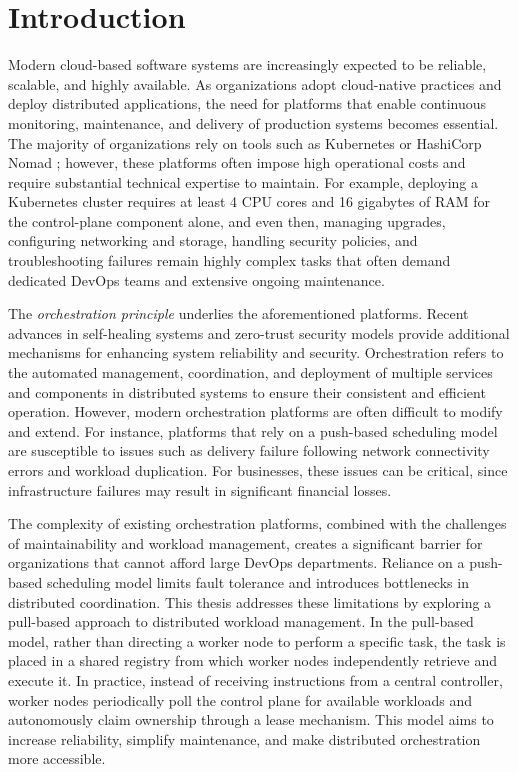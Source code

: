 \chapter{Introduction}
\label{chap:intro}

Modern cloud-based software systems are increasingly expected to be reliable, scalable, and highly available. As organizations adopt cloud-native practices and deploy distributed applications, the need for platforms that enable continuous monitoring, maintenance, and delivery of production systems becomes essential. The majority of organizations rely on tools such as Kubernetes \cite{k8s_docs} or HashiCorp Nomad \cite{nomad_docs}; however, these platforms often impose high operational costs and require substantial technical expertise to maintain. For example, deploying a Kubernetes cluster requires at least 4 CPU cores and 16 gigabytes of RAM for the control-plane component alone, and even then, managing upgrades, configuring networking and storage, handling security policies, and troubleshooting failures remain highly complex tasks that often demand dedicated DevOps teams and extensive ongoing maintenance.

The \textit{orchestration principle} \cite{sebrechts2018orchestrator, tosca2015simple} underlies the aforementioned platforms. Recent advances in self-healing systems \cite{rauba2024neurips} and zero-trust security models \cite{vankayalapati2025zerotrust} provide additional mechanisms for enhancing system reliability and security. Orchestration refers to the automated management, coordination, and deployment of multiple services and components in distributed systems to ensure their consistent and efficient operation. However, modern orchestration platforms are often difficult to modify and extend. For instance, platforms that rely on a push-based scheduling model are susceptible to issues such as delivery failure following network connectivity errors and workload duplication. For businesses, these issues can be critical, since infrastructure failures may result in significant financial losses.

The complexity of existing orchestration platforms, combined with the challenges of maintainability and workload management, creates a significant barrier for organizations that cannot afford large DevOps departments. Reliance on a push-based scheduling model limits fault tolerance and introduces bottlenecks in distributed coordination. This thesis addresses these limitations by exploring a pull-based approach to distributed workload management. In the pull-based model, rather than directing a worker node to perform a specific task, the task is placed in a shared registry from which worker nodes independently retrieve and execute it. In practice, instead of receiving instructions from a central controller, worker nodes periodically poll the control plane for available workloads and autonomously claim ownership through a lease mechanism. This model aims to increase reliability, simplify maintenance, and make distributed orchestration more accessible.


